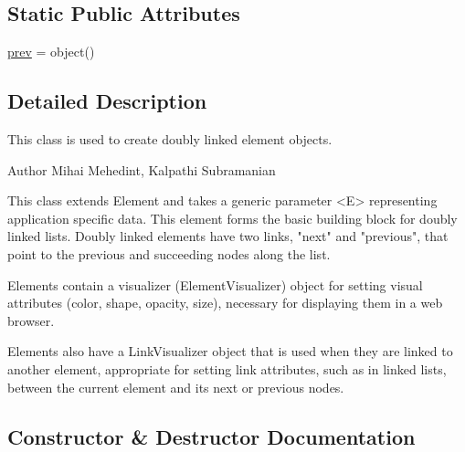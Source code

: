 \subsection*{Static Public Attributes}
\begin{DoxyCompactItemize}
\item 
\mbox{\hyperlink{class_bridges_1_1dl__element_1_1_d_lelement_a5098c0244f6c4512db45f494266baf8a}{prev}} = object()
\end{DoxyCompactItemize}


\subsection{Detailed Description}
This class is used to create doubly linked element objects. 

\begin{DoxyAuthor}{Author}
Mihai Mehedint, Kalpathi Subramanian
\end{DoxyAuthor}
\begin{DoxyVerb}This class extends Element and takes a generic parameter <E> representing
application specific data. This element forms the basic building block for
doubly linked lists. Doubly linked elements have two links,
"next" and "previous", that point to the previous and succeeding nodes along the list.

Elements contain a visualizer (ElementVisualizer) object for setting visual
attributes (color, shape, opacity, size), necessary for displaying them in a web
browser.

Elements also have a LinkVisualizer object that is used when they are linked to
another element, appropriate for setting link attributes, such as in linked lists,
between the current element and its next or previous nodes.\end{DoxyVerb}
 

\subsection{Constructor \& Destructor Documentation}
\mbox{\label{class_bridges_1_1dl__element_1_1_d_lelement_a53233b54dce75c96438912fba591217a}} 
